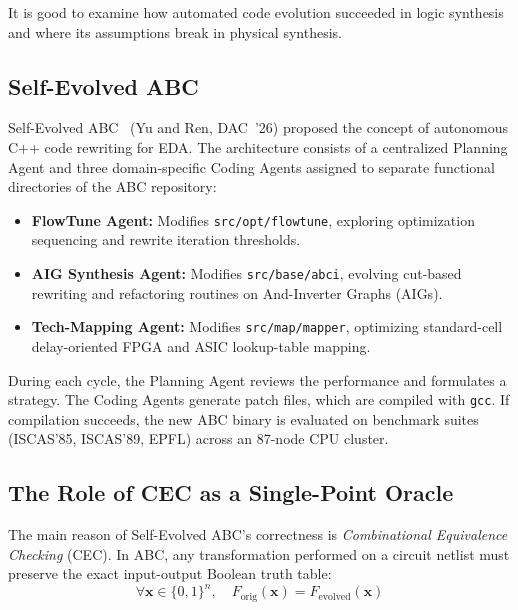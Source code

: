 \documentclass[10pt, conference]{IEEEtran}
\begin{document}
It is good to examine how automated code evolution succeeded in logic synthesis and where its assumptions break in physical synthesis.

\subsection{Self-Evolved ABC}

Self-Evolved ABC~\cite{selfevolvedabc} (Yu and Ren, DAC~'26) proposed the concept of autonomous C++ code rewriting for EDA. The architecture consists of a centralized Planning Agent and three domain-specific Coding Agents assigned to separate functional directories of the ABC repository:
\begin{itemize}
  \item \textbf{FlowTune Agent:} Modifies \texttt{src/opt/flowtune}, exploring optimization sequencing and rewrite iteration thresholds.
  \item \textbf{AIG Synthesis Agent:} Modifies \texttt{src/base/abci}, evolving cut-based rewriting and refactoring routines on And-Inverter Graphs (AIGs).
  \item \textbf{Tech-Mapping Agent:} Modifies \texttt{src/map/mapper}, optimizing standard-cell delay-oriented FPGA and ASIC lookup-table mapping.
\end{itemize}

During each cycle, the Planning Agent reviews the performance and formulates a strategy. The Coding Agents generate patch files, which are compiled with \texttt{gcc}. If compilation succeeds, the new ABC binary is evaluated on benchmark suites (ISCAS'85, ISCAS'89, EPFL) across an 87-node CPU cluster.

\subsection{The Role of CEC as a Single-Point Oracle}

The main reason of Self-Evolved ABC's correctness is \emph{Combinational Equivalence Checking} (CEC). In ABC, any transformation performed on a circuit netlist must preserve the exact input-output Boolean truth table:
\begin{equation}
  \forall \mathbf{x} \in \{0, 1\}^n, \quad F_{\text{orig}}(\mathbf{x}) = F_{\text{evolved}}(\mathbf{x})
\end{equation}
\end{document}
